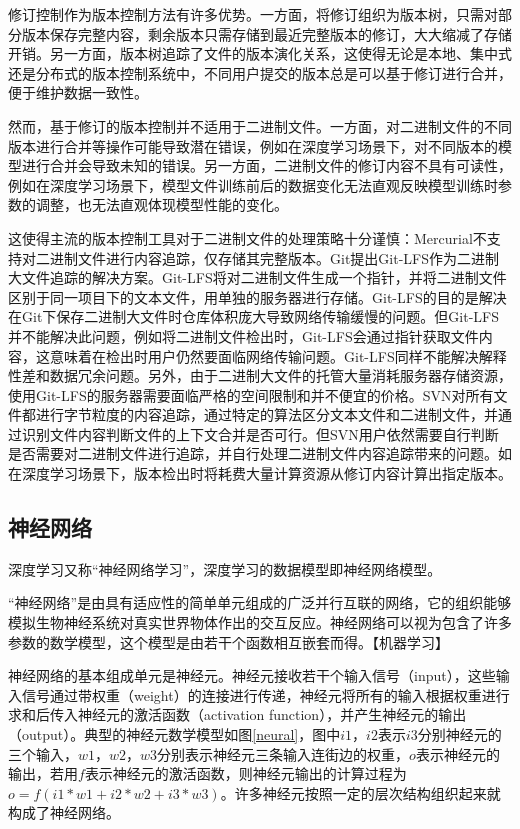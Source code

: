 \documentclass{cjc}
\begin{document}
修订控制作为版本控制方法有许多优势。一方面，将修订组织为版本树，只需对部分版本保存完整内容，剩余版本只需存储到最近完整版本的修订，大大缩减了存储开销。另一方面，版本树追踪了文件的版本演化关系，这使得无论是本地、集中式还是分布式的版本控制系统中，不同用户提交的版本总是可以基于修订进行合并，便于维护数据一致性。

然而，基于修订的版本控制并不适用于二进制文件。一方面，对二进制文件的不同版本进行合并等操作可能导致潜在错误，例如在深度学习场景下，对不同版本的模型进行合并会导致未知的错误。另一方面，二进制文件的修订内容不具有可读性，例如在深度学习场景下，模型文件训练前后的数据变化无法直观反映模型训练时参数的调整，也无法直观体现模型性能的变化。

这使得主流的版本控制工具对于二进制文件的处理策略十分谨慎：Mercurial不支持对二进制文件进行内容追踪，仅存储其完整版本。Git提出Git-LFS作为二进制大文件追踪的解决方案。Git-LFS将对二进制文件生成一个指针，并将二进制文件区别于同一项目下的文本文件，用单独的服务器进行存储。Git-LFS的目的是解决在Git下保存二进制大文件时仓库体积庞大导致网络传输缓慢的问题。但Git-LFS并不能解决此问题，例如将二进制文件检出时，Git-LFS会通过指针获取文件内容，这意味着在检出时用户仍然要面临网络传输问题。Git-LFS同样不能解决解释性差和数据冗余问题。另外，由于二进制大文件的托管大量消耗服务器存储资源，使用Git-LFS的服务器需要面临严格的空间限制和并不便宜的价格。SVN对所有文件都进行字节粒度的内容追踪，通过特定的算法区分文本文件和二进制文件，并通过识别文件内容判断文件的上下文合并是否可行。但SVN用户依然需要自行判断是否需要对二进制文件进行追踪，并自行处理二进制文件内容追踪带来的问题。如在深度学习场景下，版本检出时将耗费大量计算资源从修订内容计算出指定版本。


\subsection{神经网络}
深度学习又称“神经网络学习”，深度学习的数据模型即神经网络模型。

“神经网络”是由具有适应性的简单单元组成的广泛并行互联的网络，它的组织能够模拟生物神经系统对真实世界物体作出的交互反应。神经网络可以视为包含了许多参数的数学模型，这个模型是由若干个函数相互嵌套而得。【机器学习】

神经网络的基本组成单元是神经元。神经元接收若干个输入信号（input），这些输入信号通过带权重（weight）的连接进行传递，神经元将所有的输入根据权重进行求和后传入神经元的激活函数（activation function），并产生神经元的输出（output）。典型的神经元数学模型如图\ref{neural}，图中$i1$，$i2$表示$i3$分别神经元的三个输入，$w1$，$w2$，$w3$分别表示神经元三条输入连街边的权重，$o$表示神经元的输出，若用$f$表示神经元的激活函数，则神经元输出的计算过程为$o=f(i1*w1+i2*w2+i3*w3)$。许多神经元按照一定的层次结构组织起来就构成了神经网络。
\end{document}
